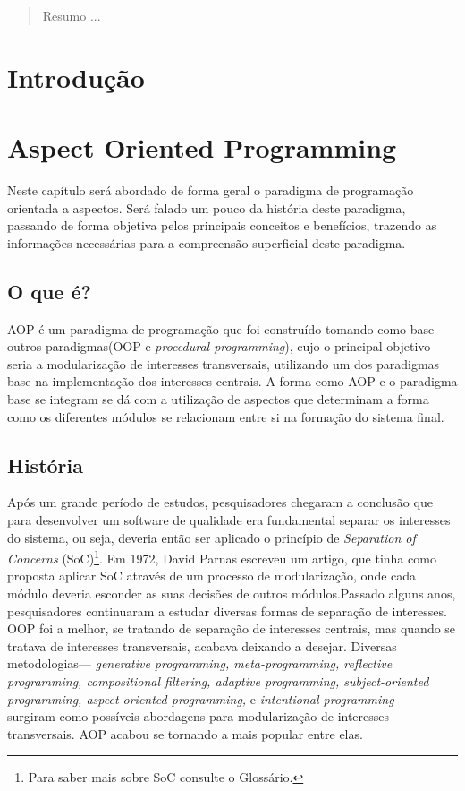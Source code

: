 \documentclass[tc,openright]{iiufrgs}
\begin{document}
\listoffigures

\listoftables

\begin{abstract}

Resumo ...

\end{abstract}

\chapter{Introdução}

\chapter{Aspect Oriented Programming}
Neste capítulo será abordado de forma geral o paradigma de programação orientada a aspectos. Será falado um pouco da história deste paradigma, passando de forma objetiva pelos principais conceitos e benefícios, trazendo as informações necessárias para a compreensão superficial deste paradigma.
\section{O que é?}
AOP é um paradigma de programação que foi construído tomando como base outros paradigmas(OOP e \textit{procedural programming}), cujo o principal objetivo seria a modularização de interesses transversais, utilizando um dos paradigmas base na implementação dos interesses centrais. A forma como AOP e o paradigma base se integram se dá com a utilização de aspectos que determinam a forma como os diferentes módulos se relacionam entre si na formação do sistema final. \cite{laddad2003aspectj}
\section{História}
Após um grande período de estudos, pesquisadores chegaram a conclusão que para desenvolver um software de qualidade era fundamental separar os interesses do sistema, ou seja, deveria então ser aplicado o princípio de \textit{Separation of Concerns} (SoC)\footnote{Para saber mais sobre SoC consulte o Glossário.}. Em 1972, David Parnas escreveu um artigo, que tinha como  proposta aplicar SoC através de um processo de modularização, onde cada módulo deveria esconder as suas decisões de outros módulos.Passado alguns anos, pesquisadores continuaram a estudar diversas formas de separação de interesses. OOP foi a melhor, se tratando de separação de interesses centrais, mas quando se tratava de interesses transversais, acabava deixando a desejar. Diversas metodologias— \textit{generative programming, meta-programming, reflective programming, compositional filtering, adaptive programming, subject-oriented programming, aspect oriented programming,} e  \textit{intentional programming}— surgiram como possíveis abordagens para modularização de interesses transversais. AOP acabou se tornando a mais popular entre elas. \cite{laddad2003aspectj}
\end{document}
